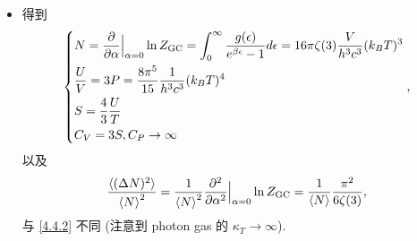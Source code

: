 \begin{itemize}
	\item 得到
	\begin{equation}
		\begin{dcases}
			N = \frac{\partial}{\partial \alpha} \Big|_{\alpha = 0} \ln Z_\text{GC} = \int_0^\infty \frac{g(\epsilon)}{e^{\beta \epsilon} - 1} d\epsilon = 16 \pi \zeta(3) \frac{V}{h^3 c^3} (k_B T)^3 \\
			\frac{U}{V} = 3 P = \frac{8 \pi^5}{15} \frac{1}{h^3 c^3} (k_B T)^4 \\
			S = \frac{4}{3} \frac{U}{T} \\
			C_V = 3 S, C_P \rightarrow \infty
		\end{dcases},
	\end{equation}
	以及
	\begin{equation}
		\frac{\braket{(\Delta N)^2}}{\braket{N}^2} = \frac{1}{\braket{N}^2} \frac{\partial^2}{\partial \alpha^2} \Big|_{\alpha = 0} \ln Z_\text{GC} = \frac{1}{\braket{N}} \frac{\pi^2}{6 \zeta(3)},
	\end{equation}
	与 \eqref{4.4.2} 不同 (注意到 photon gas 的 $\kappa_T \rightarrow \infty$).
\end{itemize}


